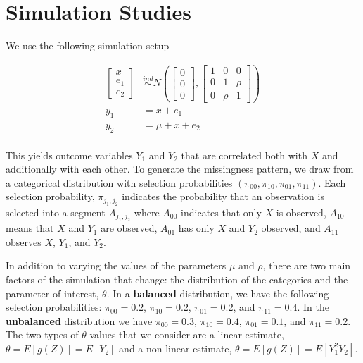 \documentclass[
  letterpaper,
  DIV=11,
  numbers=noendperiod]{scrartcl}
\begin{document}
\hypertarget{simulation-studies}{%
\section{Simulation Studies}\label{simulation-studies}}

We use the following simulation setup

\begin{align*}
  \begin{bmatrix} x \\ e_1 \\ e_2 \end{bmatrix} 
  &\stackrel{ind}{\sim} N\left(\begin{bmatrix} 0 \\ 0 \\ 0 \end{bmatrix}, 
  \begin{bmatrix} 1 & 0 & 0 \\ 0 & 1 & \rho \\ 0 & \rho & 1 \end{bmatrix}\right) \\
  y_1 &= x + e_1 \\
  y_2 &= \mu + x + e_2 \\
\end{align*}

This yields outcome variables \(Y_1\) and \(Y_2\) that are correlated
both with \(X\) and additionally with each other. To generate the
missingness pattern, we draw from a categorical distribution with
selection probabilities \((\pi_{00}, \pi_{10}, \pi_{01}, \pi_{11})\).
Each selection probability, \(\pi_{j_1, j_2}\) indicates the probability
that an observation is selected into a segment \(A_{j_1, j_2}\) where
\(A_{00}\) indicates that only \(X\) is observed, \(A_{10}\) means that
\(X\) and \(Y_1\) are observed, \(A_{01}\) has only \(X\) and \(Y_2\)
observed, and \(A_{11}\) observes \(X\), \(Y_1\), and \(Y_2\).

In addition to varying the values of the parameters \(\mu\) and
\(\rho\), there are two main factors of the simulation that change: the
distribution of the categories and the parameter of interest,
\(\theta\). In a \textbf{balanced} distribution, we have the following
selection probabilities: \(\pi_{00} = 0.2\), \(\pi_{10} = 0.2\),
\(\pi_{01} = 0.2\), and \(\pi_{11} = 0.4\). In the \textbf{unbalanced}
distribution we have \(\pi_{00} = 0.3\), \(\pi_{10} = 0.4\),
\(\pi_{01} = 0.1\), and \(\pi_{11} = 0.2\). The two types of \(\theta\)
values that we consider are a linear estimate,
\(\theta = E[g(Z)] = E[Y_2]\) and a non-linear estimate,
\(\theta = E[g(Z)] = E[Y_1^2 Y_2]\).
\end{document}
